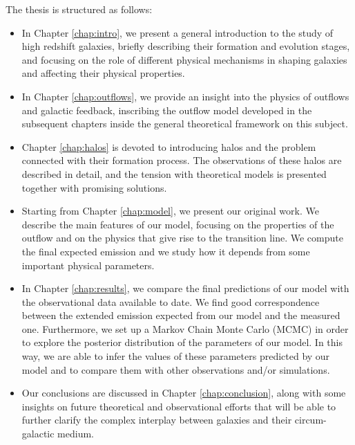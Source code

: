 The thesis is structured as follows: 
\begin{itemize}
    \item In Chapter \ref{chap:intro}, we present a general introduction to the study of high redshift galaxies, briefly describing their formation and evolution stages, and focusing on the role of different physical mechanisms in shaping galaxies and affecting their physical properties.
    \item In Chapter \ref{chap:outflows}, we provide an insight into the physics of outflows and galactic feedback, inscribing the outflow model developed in the subsequent chapters inside the general theoretical framework on this subject. 
    \item Chapter \ref{chap:halos} is devoted to introducing \CII halos and the problem connected with their formation process. The observations of these halos are described in detail, and the tension with theoretical models is presented together with promising solutions. 
    \item Starting from Chapter \ref{chap:model}, we present our original work. We describe the main features of our model, focusing on the properties of the outflow and on the physics that give rise to the \CII transition line. We compute the final expected \CII emission and we study how it depends from some important physical parameters.
    \item In Chapter \ref{chap:results}, we compare the final predictions of our model with the observational data available to date. We find good correspondence between the extended \CII emission expected from our model and the measured one. Furthermore, we set up a Markov Chain Monte Carlo (MCMC) in order to explore the posterior distribution of the parameters of our model. In this way, we are able to infer the values of these parameters predicted by our model and to compare them with other observations and/or simulations. 
    \item Our conclusions are discussed in Chapter \ref{chap:conclusion}, along with some insights on future theoretical and observational efforts that will be able to further clarify the complex interplay between galaxies and their circum-galactic medium.
\end{itemize}

